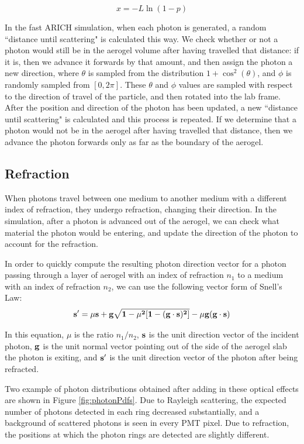 \begin{equation}
x =   -L\ln(1-p)
  \label{eq:randomScat}
\end{equation}

In the fast ARICH simulation, when each photon is generated, a random ``distance until scattering" is calculated this way. 
We check whether or not a photon would still be in the aerogel volume after having travelled that distance: if it is, then we advance it forwards by that amount, and then assign the photon a new direction, where $\theta$ is sampled from the distribution $1 + \cos^2(\theta)$, and $\phi$ is randomly sampled from $[0, 2\pi]$.
These $\theta$ and $\phi$ values are sampled with respect to the direction of travel of the particle, and then rotated into the lab frame.
After the position and direction of the photon has been updated, a new ``distance until scattering" is calculated and this process is repeated. 
If we determine that a photon would not be in the aerogel after having travelled that distance, then we advance the photon forwards only as far as the boundary of the aerogel.

\subsection{Refraction}
When photons travel between one medium to another medium with a different index of refraction, they undergo refraction, changing their direction.
In the simulation, after a photon is advanced out of the aerogel, we can check what material the photon would be entering, and update the direction of the photon to account for the refraction.

In order to quickly compute the resulting photon direction vector for a photon passing through a layer of aerogel with an index of refraction $n_1$ to a medium with an index of refraction $n_2$, we can use the following vector form of Snell's Law: \cite{snell}
\begin{equation}
\bf{s'} = \mu\bf{s} + \bf{g}\sqrt{1 - \mu^2[1-(\bf{g \cdot s})^2]} - \mu \bf{g}(\bf{g \cdot s})
\label{eq:refract}
\end{equation}

In this equation, $\mu$ is the ratio $n_1/n_2$,  $\bf{s}$ is the unit direction vector of the incident photon, $\bf{g}$ is the unit normal vector pointing out of the side of the aerogel slab the photon is exiting, and $\bf{s'}$ is the unit direction vector of the photon after being refracted.

Two example of photon distributions obtained after adding in these optical effects are shown in Figure \ref{fig:photonPdfs}.
Due to Rayleigh scattering, the expected number of photons detected in each ring decreased substantially, and a background of scattered photons is seen in every PMT pixel.
Due to refraction, the positions at which the photon rings are detected are slightly different.

